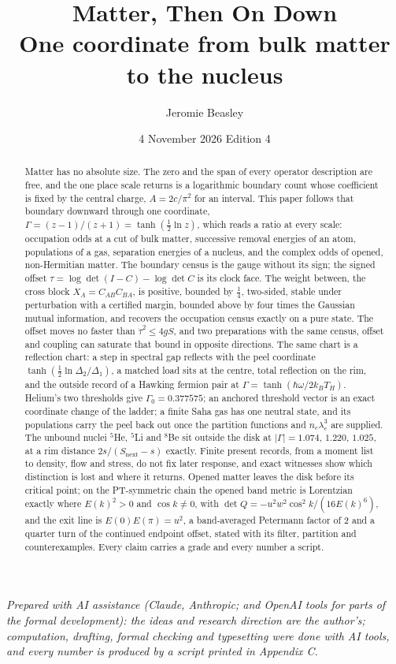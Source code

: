 \documentclass[11pt]{article}
\title{Matter, Then On Down\\[4pt]\large One coordinate from bulk matter to the nucleus}
\author{Jeromie Beasley}
\date{4 November 2026 \quad Edition 4}
\theoremstyle{definition}
\begin{document}
\maketitle

\noindent\emph{Prepared with AI assistance (Claude, Anthropic; and OpenAI tools for parts of the formal development): the ideas and research direction are the author's; computation, drafting, formal checking and typesetting were done with AI tools, and every number is produced by a script printed in Appendix C.}

\begin{abstract}
Matter has no absolute size. The zero and the span of every operator description are free, and the one place scale returns is a logarithmic boundary count whose coefficient is fixed by the central charge, $A=2c/\pi^2$ for an interval. This paper follows that boundary downward through one coordinate, $\Gamma=(z-1)/(z+1)=\tanh(\tfrac12\ln z)$, which reads a ratio at every scale: occupation odds at a cut of bulk matter, successive removal energies of an atom, populations of a gas, separation energies of a nucleus, and the complex odds of opened, non-Hermitian matter. The boundary census is the gauge without its sign; the signed offset $\tau=\log\det(I-C)-\log\det C$ is its clock face. The weight between, the cross block $X_A=C_{AB}C_{BA}$, is positive, bounded by $\tfrac14$, two-sided, stable under perturbation with a certified margin, bounded above by four times the Gaussian mutual information, and recovers the occupation census exactly on a pure state. The offset moves no faster than $\dot\tau^2\le4gS$, and two preparations with the same census, offset and coupling can saturate that bound in opposite directions. The same chart is a reflection chart: a step in spectral gap reflects with the peel coordinate $\tanh(\tfrac12\ln\Delta_2/\Delta_1)$, a matched load sits at the centre, total reflection on the rim, and the outside record of a Hawking fermion pair at $\Gamma=\tanh(\hbar\omega/2k_BT_H)$. Helium's two thresholds give $\Gamma_0=0.377575$; an anchored threshold vector is an exact coordinate change of the ladder; a finite Saha gas has one neutral state, and its populations carry the peel back out once the partition functions and $n_e\lambda_e^3$ are supplied. The unbound nuclei ${}^5$He, ${}^5$Li and ${}^8$Be sit outside the disk at $|\Gamma|=1.074$, $1.220$, $1.025$, at a rim distance $2s/(S_{\mathrm{next}}-s)$ exactly. Finite present records, from a moment list to density, flow and stress, do not fix later response, and exact witnesses show which distinction is lost and where it returns. Opened matter leaves the disk before its critical point; on the PT-symmetric chain the opened band metric is Lorentzian exactly where $E(k)^2>0$ and $\cos k\neq0$, with $\det Q=-u^2w^2\cos^2k/(16E(k)^6)$, and the exit line is $E(0)E(\pi)=u^2$, a band-averaged Petermann factor of 2 and a quarter turn of the continued endpoint offset, stated with its filter, partition and counterexamples. Every claim carries a grade and every number a script.
\end{abstract}
\end{document}
